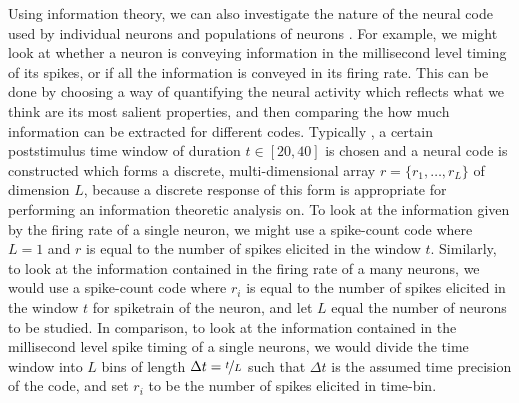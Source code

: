 Using information theory, we can also investigate the nature of the neural code used by individual neurons and populations of neurons \citep{Optican1987}.
For example, we might look at whether a neuron is conveying information in the millisecond level timing of its spikes, or if all the information is conveyed in its firing rate.
This can be done by choosing a way of quantifying the neural activity which reflects what we think are its most salient properties, and then comparing the how much information can be extracted for different codes.
Typically \citep{Quiroga2009,Brasselet2012,Panzeri2007,Arabzadeh2006,Strong1998}, a certain poststimulus time window of duration $t \in [20,40]$ is chosen and a neural code is constructed which forms a discrete, multi-dimensional array $r = \{r_1, \ldots, r_L\}$ of dimension $L$, because a discrete response of this form is appropriate for performing an information theoretic analysis on.
To look at the information given by the firing rate of a single neuron, we might use a spike-count code where $L=1$ and $r$ is equal to the number of spikes elicited in the window $t$.
Similarly, to look at the information contained in the firing rate of a many neurons, we would use a spike-count code where $r_i$ is equal to the number of spikes elicited in the window $t$ for spiketrain of the  neuron, and let $L$ equal the number of neurons to be studied.
In comparison, to look at the information contained in the millisecond level spike timing of a single neurons, we would divide the time window into $L$ bins of length $\Delta t = \nicefrac{t}{L}$ such that $\Delta t$ is the assumed time precision of the code, and set $r_i$ to be the number of spikes elicited in  time-bin.

